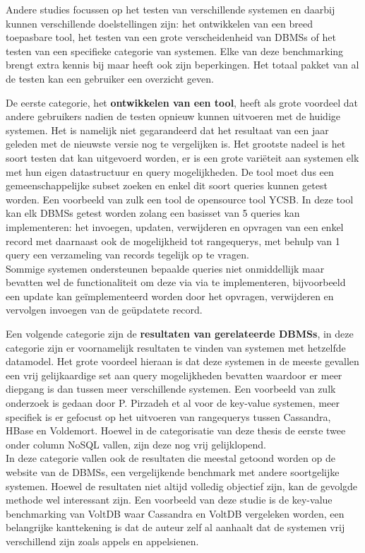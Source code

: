 Andere studies focussen op het testen van verschillende systemen en daarbij kunnen verschillende doelstellingen zijn: het ontwikkelen van een breed toepasbare tool, het testen van een grote verscheidenheid van \glspl{DBMS} of het testen van een specifieke categorie van systemen. Elke van deze benchmarking brengt extra kennis bij maar heeft ook zijn beperkingen. Het totaal pakket van al de testen kan een gebruiker een overzicht geven. 

De eerste categorie, het \textbf{ontwikkelen van een tool}, heeft als grote voordeel dat andere gebruikers nadien de testen opnieuw kunnen uitvoeren met de huidige systemen. Het is namelijk niet gegarandeerd dat het resultaat van een jaar geleden met de nieuwste versie nog te vergelijken is. Het grootste nadeel is het soort testen dat kan uitgevoerd worden, er is een grote variëteit aan systemen elk met hun eigen datastructuur en query mogelijkheden. De tool moet dus een gemeenschappelijke subset zoeken en enkel dit soort queries kunnen getest worden. Een voorbeeld van zulk een tool de opensource tool YCSB\cite{cooper2010benchmarking}. In deze tool kan elk \glspl{DBMS} getest worden zolang een basisset van 5 queries kan implementeren: het invoegen, updaten, verwijderen en opvragen van een enkel record met daarnaast ook de mogelijkheid tot \glspl{rangequery}, met behulp van 1 query een verzameling van records tegelijk op te vragen. \\
Sommige systemen ondersteunen bepaalde queries niet onmiddellijk maar bevatten wel de functionaliteit om deze via via te implementeren, bijvoorbeeld een update kan geïmplementeerd worden door het opvragen, verwijderen en vervolgen invoegen van de geüpdatete record. 

Een volgende categorie zijn de \textbf{resultaten van gerelateerde \glspl{DBMS}}, in deze categorie zijn er voornamelijk resultaten te vinden van systemen met hetzelfde datamodel. Het grote voordeel hieraan is dat deze systemen in de meeste gevallen een vrij gelijkaardige set aan query mogelijkheden bevatten waardoor er meer diepgang is dan tussen meer verschillende systemen. Een voorbeeld van zulk onderzoek is gedaan door P. Pirzadeh et al\cite{pirzadeh2011performance} voor de key-value systemen, meer specifiek is er gefocust op het uitvoeren van \glspl{rangequery} tussen Cassandra, HBase en Voldemort. Hoewel in de categorisatie van deze thesis de eerste twee onder column NoSQL vallen, zijn deze nog vrij gelijklopend. \\
In deze categorie vallen ook de resultaten die meestal getoond worden op de website van de \glspl{DBMS}, een vergelijkende benchmark met andere soortgelijke systemen. Hoewel de resultaten niet altijd volledig objectief zijn, kan de gevolgde methode wel interessant zijn. Een voorbeeld van deze studie is de key-value benchmarking van VoltDB\cite{huggkey} waar Cassandra en VoltDB vergeleken worden, een belangrijke kanttekening is dat de auteur zelf al aanhaalt dat de systemen vrij verschillend zijn zoals appels en appelsienen.   


